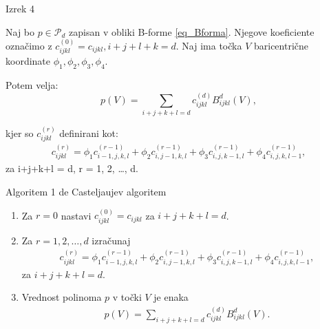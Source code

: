 \documentclass{beamer}
\begin{document}
\begin{frame}{Izrek 4}
\begin{theorem}
    Naj bo $p \in \mathcal{P}_d$ zapisan v obliki B-forme \eqref{eq_Bforma}. Njegove koeficiente označimo z $c_{ijkl}^{(0)} = c_{ijkl}, i+j+l+k = d$.
    Naj ima točka $V$ baricentrične koordinate $\phi_1, \phi_2, \phi_3, \phi_4$.

    Potem velja:
    $$
    p(V) = \sum_{i+j+k+l = d} c_{ijkl}^{(d)} B_{ijkl}^d(V),
    $$

    kjer so  $c_{ijkl}^{(r)}$ definirani kot:
    \begin{align*}
        c_{ijkl}^{(r)} = \phi_1 c_{i-1,j,k,l}^{(r-1)} + \phi_2 c_{i,j-1,k,l}^{(r-1)} + \phi_3 c_{i,j,k-1,l}^{(r-1)} + \phi_4 c_{i,j,k,l-1}^{(r-1)},
    \end{align*}
    za i+j+k+l = d, r = 1, 2, \ldots, d.
\end{theorem}
\end{frame}


\begin{frame}{Algoritem 1}
de Casteljaujev algoritem
    \begin{enumerate}
        \item Za $r = 0$ nastavi $c_{ijkl}^{(0)} = c_{ijkl}$ za $i+j+k+l = d$.
        \item Za $r = 1, 2, \ldots, d$ izračunaj
        \begin{align*}
            c_{ijkl}^{(r)} = \phi_1 c_{i-1,j,k,l}^{(r-1)} + \phi_2 c_{i,j-1,k,l}^{(r-1)} + \phi_3 c_{i,j,k-1,l}^{(r-1)} + \phi_4 c_{i,j,k,l-1}^{(r-1)},
        \end{align*}
        za $i+j+k+l = d$.
        \item Vrednost polinoma $p$ v točki $V$ je enaka
        \begin{align*}
            p(V) = \sum_{i+j+k+l = d} c_{ijkl}^{(d)} B_{ijkl}^d(V).
        \end{align*}
    \end{enumerate}

\end{frame}
\end{document}
